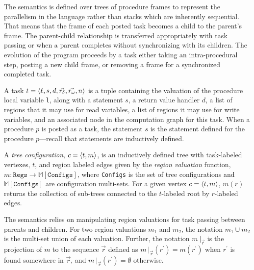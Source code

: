The semantics is defined over trees of procedure frames to represent the parallelism in the language rather than stacks which are inherently sequential. That means that the frame of each posted task becomes a child to the parent's frame. The parent-child relationship is transferred appropriately with task passing or when a parent completes without synchronizing with its children. The evolution of the program proceeds by a task either taking an intra-procedural step, posting a new child frame, or removing a frame for a synchronized completed task.

A task $t = \langle \ell, s, d, \vec{r_\delta}, \vec{r_\omega}, n \rangle $ is a tuple containing the valuation of the procedure local variable \texttt{l}, along with a statement $s$, a return value handler $d$, a list of regions that it may use for read variables, a list of regions it may use for write variables, and an associated node in the computation graph for this task. When a procedure $p$ is posted as a task, the statement $s$ is the statement defined for the procedure $p$---recall that statements are inductively defined. 

A \emph{tree configuration}, $c = \langle t,m \rangle $, is an inductively defined tree with task-labeled vertexes, $t$, and region labeled edges given by the \emph{region valuation} function, $m : \texttt{Regs} \rightarrow \mathbb{M}[\texttt{Configs}]$, where \texttt{Configs} is the set of tree configurations and $\mathbb{M}[\texttt{Configs}]$ are configuration multi-sets. For a given vertex $c = \langle t,m \rangle $, $m(r)$ returns the collection of sub-trees connected to the $t$-labeled root by $r$-labeled edges.

The semantics relies on manipulating region valuations for task passing between parents and children. For two region valuations $m_1$ and $m_2$, the notation $m_1 \cup m_2$ is the multi-set union of each valuation. Further, the notation $m\ |_{\vec{r}}$ is the projection of $m$ to the sequence $\vec{r}$ defined as $m\ |_{\vec{r}}(r^\prime) = m(r^\prime)$  when $r^\prime$ is found somewhere in $\vec{r}$, and $m\ |_{\vec{r}}(r^\prime) = \emptyset$ otherwise. 

